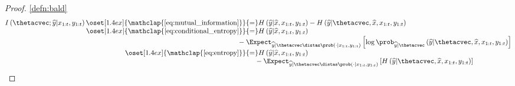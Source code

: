 \begin{proofbox}\nospacing
   \begin{proof}\label{proof:defn:bald}\cref{defn:bald}
     \begin{align*}
       I\left(\thetacvec;\widehat{y}|x_{1:t},y_{1:t}\right)
       \oset[1.4ex]{\mathclap{\text{\cref{eq:mutual_information}}}}{=}&
            H\left(\widehat{y}|\widehat{x},x_{1:t},y_{1:t}\right)- H\left(\widehat{y}|\thetacvec,\widehat{x},x_{1:t},y_{1:t}\right)\\[-1\jot]
       \oset[1.4ex]{\mathclap{\text{\cref{eq:conditional_entropy}}}}{=}&
         H\left(\widehat{y}|\widehat{x},x_{1:t},y_{1:t}\right)\\[-1\jot]
        &\hspace{-3em}-\Expect_{\widehat{y}|\thetacvec\distas\prob(\cdot|x_{1:t},y_{1:t})}
         \left[\log\prob_{\widehat{y}|\thetacvec}\left(\widehat{y}|\thetacvec,\widehat{x},x_{1:t},y_{1:t}\right)\right]
       \\[-1\jot]
       \oset[1.4ex]{\mathclap{\text{\cref{eq:entropy}}}}{=}&
         H\left(\widehat{y}|\widehat{x},x_{1:t},y_{1:t}\right)\\[-1\jot]
        &\hspace{-0.5em}-\Expect_{\widehat{y}|\thetacvec\distas\prob(\cdot|x_{1:t},y_{1:t})}
         \left[H\left(\widehat{y}|\thetacvec,\widehat{x},x_{1:t},y_{1:t}\right)\right]
     \end{align*}
   \end{proof}
\end{proofbox}
